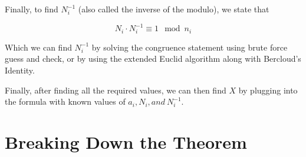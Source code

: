 \documentclass[index]{subfiles}
\begin{document}
Finally, to find \(N_i^{-1}\) (also called the inverse of the modulo), we state that 

\begin{equation*}
   N_i\cdot N_i^{-1}\equiv 1 \mod n_i 
\end{equation*}

Which we can find \(N_i^{-1}\) by solving the congruence statement using brute force guess and check, or by using the extended Euclid algorithm along with Bercloud's Identity. 

Finally, after finding all the required values, we can then find \(X\) by plugging into the formula with known values of \(a_{i}, N_{i}, and\ N_{i}^{-1}\).

\section{Breaking Down the Theorem}

\newpage

\raggedright{}
\printbibliography[heading=bibintoc]
\end{document}
